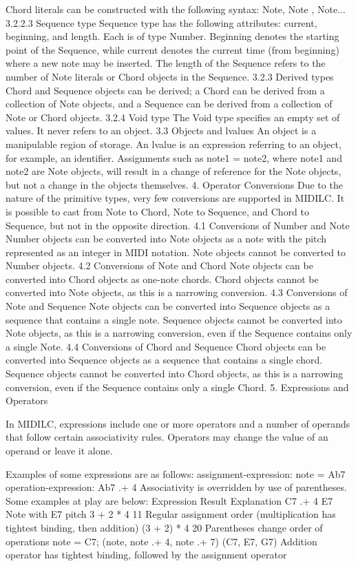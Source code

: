 \documentclass[12pt,A4]{book}
\begin{document}
Chord literals can be constructed with the following syntax:
{ Note,  Note , Note... }
3.2.2.3 Sequence type
Sequence type has the following attributes: current, beginning, and length. Each is of type Number. Beginning denotes the starting point of the Sequence, while current denotes the current time (from beginning) where a new note may be inserted. The length of the Sequence refers to the number of Note literals or Chord objects in the Sequence.
3.2.3 Derived types
Chord and Sequence objects can be derived; a Chord can be derived from a collection of Note objects, and a Sequence can be derived from a collection of Note or Chord objects.
3.2.4 Void type
The Void type specifies an empty set of values. It never refers to an object.
3.3 Objects and lvalues
An object is a manipulable region of storage. An lvalue is an expression referring to an object, for example, an identifier. Assignments such as note1 = note2, where note1 and note2 are Note objects, will result in a change of reference for the Note objects, but not a change in the objects themselves.
4. Operator Conversions
Due to the nature of the primitive types, very few conversions are supported in MIDILC. It is possible to cast from Note to Chord, Note to Sequence, and Chord to Sequence, but not in the opposite direction.
4.1 Conversions of Number and Note
Number objects can be converted into Note objects as a note with the pitch represented as an integer in MIDI notation. Note objects cannot be converted to Number objects.
4.2 Conversions of Note and Chord
Note objects can be converted into Chord objects as one-note chords. Chord objects cannot be converted into Note objects, as this is a narrowing conversion.
4.3 Conversions of Note and Sequence
Note objects can be converted into Sequence objects as a sequence that contains a single note. Sequence objects cannot be converted into Note objects, as this is a narrowing conversion, even if the Sequence contains only a single Note.
4.4 Conversions of Chord and Sequence
Chord objects can be converted into Sequence objects as a sequence that contains a single chord. Sequence objects cannot be converted into Chord objects, as this is a narrowing conversion, even if the Sequence contains only a single Chord.
5. Expressions and Operators

In MIDILC, expressions include one or more operators and a number of operands that follow certain associativity rules. Operators may change the value of an operand or leave it alone.

Examples of some expressions are as follows:
assignment-expression:    note = Ab7
operation-expression:        Ab7 .+ 4
Associativity is overridden by use of parentheses. Some examples at play are below:
Expression	Result	Explanation
C7 .+ 4 	E7	Note with E7 pitch
3 + 2 * 4	11	Regular assignment order (multiplication has tightest binding, then addition)
(3 + 2) * 4	20	Parentheses change order of operations
note = C7;
(note, note .+ 4, note .+ 7) 	(C7, E7, G7)	Addition operator has tightest binding, followed by the assignment operator
\end{document}
